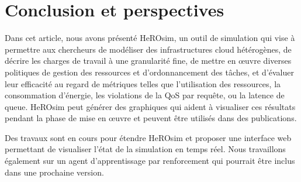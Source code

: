 \section{Conclusion et perspectives}
\label{section:herosim-conclusion}

Dans cet article, nous avons présenté HeROsim, un outil de simulation qui vise à permettre aux chercheurs de modéliser des infrastructures cloud hétérogènes, de décrire les charges de travail à une granularité fine, de mettre en œuvre diverses politiques de gestion des ressources et d'ordonnancement des tâches, et d'évaluer leur efficacité au regard de métriques telles que l'utilisation des ressources, la consommation d'énergie, les violations de la QoS par requête, ou la latence de queue. HeROsim peut générer des graphiques qui aident à visualiser ces résultats pendant la phase de mise en œuvre et peuvent être utilisés dans des publications.

Des travaux sont en cours pour étendre HeROsim et proposer une interface web permettant de visualiser l'état de la simulation en temps réel. Nous travaillons également sur un agent d'apprentissage par renforcement qui pourrait être inclus dans une prochaine version.